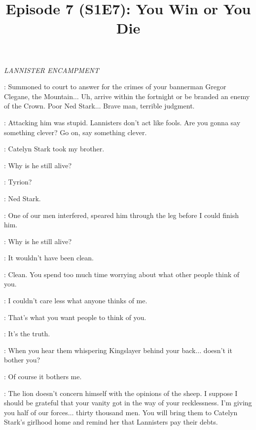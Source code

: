 

\title{Episode 7 (S1E7): You Win or You Die}
\author{}
\date{}
\maketitle




\scene

\textit{LANNISTER ENCAMPMENT}


\JAIME:  Summoned to court to answer for the crimes of your bannerman Gregor Clegane, the Mountain$\ldots$ Uh, arrive within the fortnight or be branded an enemy of the Crown. Poor Ned Stark$\ldots$ Brave man, terrible judgment. 

\TYWIN: Attacking him was stupid. Lannisters don't act like fools. Are you gonna say something clever? Go on, say something clever. 

\JAIME: Catelyn Stark took my brother. 

\TYWIN: Why is he still alive? 

\JAIME: Tyrion? 

\TYWIN: Ned Stark. 

\JAIME: One of our men interfered, speared him through the leg before I could finish him. 

\TYWIN: Why is he still alive? 

\JAIME: It wouldn't have been clean. 

\TYWIN: Clean. You spend too much time worrying about what other people think of you. 

\JAIME: I couldn't care less what anyone thinks of me. 

\TYWIN: That's what you want people to think of you. 

\JAIME: It's the truth. 

\TYWIN: When you hear them whispering Kingslayer behind your back$\ldots$ doesn't it bother you? 

\JAIME: Of course it bothers me. 

\TYWIN: The lion doesn't concern himself with the opinions of the sheep. I suppose I should be grateful that your vanity got in the way of your recklessness. I'm giving you half of our forces$\ldots$ thirty thousand men. You will bring them to Catelyn Stark's girlhood home and remind her that Lannisters pay their debts. 

